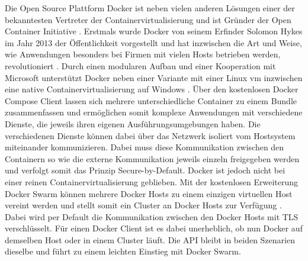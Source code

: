 Die Open Source Plattform Docker ist neben vielen anderen Lösungen einer der bekanntesten Vertreter der Containervirtualisierung und ist Gründer der Open Container Initiative \cite{about_docker}. Erstmals wurde Docker von seinem Erfinder Solomon Hykes im Jahr 2013 der Öffentlichkeit vorgestellt und hat inzwischen die Art und Weise, wie Anwendungen besonders bei Firmen mit vielen Hosts betrieben werden, revolutioniert \cite{docker_adoption}. Durch einen modularen Aufbau und einer Kooperation mit Microsoft unterstützt Docker neben einer Variante mit einer Linux \ac{vm} inzwischen eine native Containervirtualisierung auf Windows \cite{docker_for_windows}. Über den kostenlosen Docker Compose Client lassen sich mehrere unterschiedliche Container zu einem Bundle zusammenfassen \cite{docker_compose} und ermöglichen somit komplexe Anwendungen mit verschiedene Dienste, die jeweils ihren eigenen Ausführungsumgebungen haben. Die verschiedenen Dienste können dabei über das Netzwerk isoliert vom Hostsystem miteinander kommunizieren. Dabei muss diese Kommunikation zwischen den Containern so wie die externe Kommunikation jeweils einzeln freigegeben werden und verfolgt somit das Prinzip Secure-by-Default. Docker ist jedoch nicht bei einer reinen Containervirtualisierung geblieben. Mit der kostenlosen Erweiterung Docker Swarm können mehrere Docker Hosts zu einem einzigen virtuellen Host vereint werden und stellt somit ein Cluster an Docker Hosts zur Verfügung \cite{docker_swarm}. Dabei wird per Default die Kommunikation zwischen den Docker Hosts mit TLS verschlüsselt. Für einen Docker Client ist es dabei unerheblich, ob nun Docker auf demselben Host oder in einem Cluster läuft. Die API bleibt in beiden Szenarien dieselbe und führt zu einem leichten Einstieg mit Docker Swarm.
